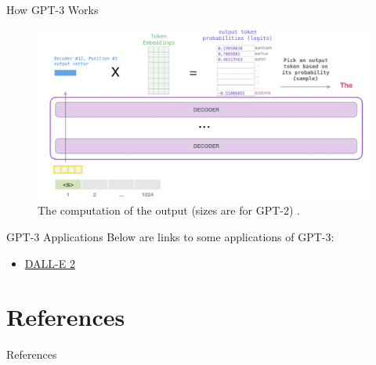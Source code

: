\documentclass{beamer}
\begin{document}
\begin{frame}{How GPT-3 Works}
    \begin{figure}
        \centering
        \includegraphics[scale=0.35]{gpt3_output}
        \caption{The computation of the output (sizes are for GPT-2) \cite{alammar2019}.}
        \label{fig:gpt3_output}
    \end{figure}
\end{frame}

\begin{frame}{GPT-3 Applications}
    Below are links to some applications of GPT-3:
    \begin{itemize}
        \item \href{https://openai.com/dall-e-2/}{DALL-E 2}
    \end{itemize}
\end{frame}

\section{References}

\begin{frame}[allowframebreaks]{References}
    \nocite{*}
    \printbibliography
\end{frame}
\end{document}
